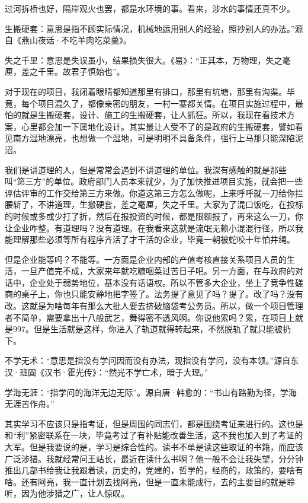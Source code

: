 \documentclass[
]{book}
\begin{document}
过河拆桥也好，隔岸观火也罢，都是水环境的事。看来，涉水的事情还真不少。

生搬硬套：意思是指不顾实际情况，机械地运用别人的经验，照抄别人的办法。''源自《燕山夜话·不吃羊肉吃菜羹》。

失之千里：意思是失误虽小，结果损失很大。《易》：``正其本，万物理，失之毫厘，差之千里。故君子慎始也''。

对于现在的项目，我闭着眼睛都知道那里有排口，那里有坑塘，那里有沟渠。毕竟，每个项目混久了，都像亲密的朋友，一村一寨都关情。在项目实施过程中，最怕的就是生搬硬套，设计、施工的生搬硬套，让人抓狂。所以，我现在看技术方案，心里都会加一下属地化设计。其实最让人受不了的是政府的生搬硬套，譬如看见南方湿地漂亮，也想做一个湿地，可是明明不具备条件，强行上马那只能深陷泥沼。

我们是讲道理的人，但是常常会遇到不讲道理的单位。我深有感触的就是那些叫``第三方''的单位。政府部门人员本来就少，为了加快推进项目实施，就会把一些评估评审的工作交给第三方来做。你道这第三方怎么做呢，上来呼呼就一刀给你拦腰斩了，不讲道理，生搬硬套，差之毫厘，失之千里。大家为了混口饭吃，在投标的时候或多或少打了折，然后在报投资的时候，都是限额报了，再来这么一刀，你让企业咋整。有道理吗？没有道理。在我看来这就是流氓无赖小混混行径，所以我能理解那些必须等所有程序齐活了才干活的企业，毕竟一朝被蛇咬十年怕井绳。

但是企业能等吗？不能等。一方面是企业内部的产值考核直接关系项目人员的生活，一旦产值完不成，大家来年就吃糠咽菜过苦日子吧。另一方面，在与政府的对话中，企业处于弱势地位，基本没有话语权。所以不管多大企业，坐上了竞争性磋商的桌子上，你也只能安静地把字签了。法务提了意见了吗？提了。改了吗？没有改。这就是为啥每年有那么大批人要去挤破脑袋考公务员。所以，做一个项目管理者不简单，需要拿出十八般武艺，舞得密不透风啊。你说他累吗？累，在项目上就是997。但是生活就是这样，你进入了轨道就得转起来，不然脱轨了就只能被扔下。

不学无术：``意思是指没有学问因而没有办法，现指没有学问，没有本领。''源自东汉·班固《汉书·霍光传》：``然光不学亡术，暗于大理。''

学海无涯：``指学问的海洋无边无际''。源自唐·韩愈的：``书山有路勤为径，学海无涯苦作舟。''

其实学习不应该只是指考证，但是周围的同志们，都是围绕考证来进行的。这也是和``利''紧密联系在一块，毕竟考过了有补贴能改善生活，这不我也加入到了考证的大军。但是我要说的是，学习是综合性的。读书不单是读这些取证的书籍，而应该广泛涉猎。我就经常问王站长，最近在读什么书啊？他一般不会让我失望，分分钟推出几部书给我让我跟着读，历史的，党建的，哲学的，经商的，政策的，要啥有啥。还有阿亮，我一直计划去找阿亮，但是一直未能成行，去的主要目的就是聆听，因为他涉猎之广，让人惊叹。
\end{document}
